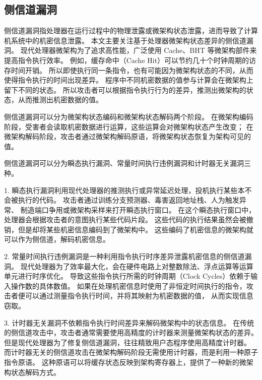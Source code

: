 \subsection{侧信道漏洞}

侧信道漏洞指处理器在运行过程中的物理泄露或微架构状态泄露，进而导致了计算机系统中的机密信息泄露。
本文主要关注基于处理器微架构状态差异的侧信道漏洞。
现代处理器微架构为了追求高性能，广泛使用 Cache、BHT 等微架构部件来提高指令执行效率。
例如，缓存命中（Cache Hit）可以节约几十个时钟周期的访存时间开销。
所以即使执行同一条指令，也有可能因为微架构状态的不同，从而使得指令执行的时间出现差异。
程序中不同机密数据的值参与计算会在微架构上留下不同的状态。
所以攻击者可以根据指令执行行为的差异，推测出微架构的状态，从而推测出机密数据的值。

侧信道漏洞可以分为微架构状态编码和微架构状态解码两个阶段。
在微架构编码阶段，受害者会读取机密数据进行运算，这些运算会对微架构状态产生改变；
在微架构解码阶段，攻击者通过微架构解码原语\cite{184415}，将微架构状态恢复为架构可见的值。

侧信道漏洞可以分为瞬态执行漏洞、常量时间执行违例漏洞和计时器无关漏洞三种。

1. 瞬态执行漏洞利用现代处理器的推测执行或异常延迟处理，投机执行某些本不会被执行的代码。
攻击者通过训练分支预测器\cite{8835233}、毒害返回地址栈\cite{10.1145/3243734.3243761}、人为触发异常\cite{10.1145/3357033}、
制造端口争用\cite{10.1145/3319535.3363194}或微架构采样\cite{10.5555/3277203.3277277}来打开瞬态执行窗口。
在这个瞬态执行窗口中，处理器会根据攻击者的意图执行某些代码片段。
这些代码的执行结果虽然会被撤销，但是却将某些机密信息编码到了微架构中。
这些编码了机密信息的微架构就可以作为侧信道，解码机密信息。

2. 常量时间执行违例漏洞是一种利用指令执行时序差异泄露机密信息的侧信道漏洞。
现代处理器为了效率最大化，会在硬件电路上对整数除法、浮点运算等运算单元进行时序优化\cite{10.5555/3698900.3699201}\cite{10.5555/3620237.3620638}。
导致这些指令执行所需的时钟周期（Clock Cycles）依赖于输入操作数的具体数值。
如果在处理机密信息时使用了非恒定时间执行的指令，攻击者便可以通过测量指令执行时间，并将其映射为机密数据的值，
从而实现信息窃取。

3. 计时器无关漏洞\cite{10.1145/3719027.3744833}\cite{291182}不依赖指令执行时间差异来解码微架构中的状态信息。
在传统的侧信道攻击中，攻击者通常需要使用高精度的计时器来测量微架构状态的差异。
但是现代处理器为了修复侧信道漏洞，往往精致用户态程序使用高精度计时器。
而计时器无关的侧信道攻击在微架构解码阶段无需使用计时器，而是利用一种原子指令原语\cite{10.1145/3719027.3744833}\cite{291182}。
这种原语可以将缓存状态反映到架构寄存器上，提供了一种新的微架构状态解码方式。


